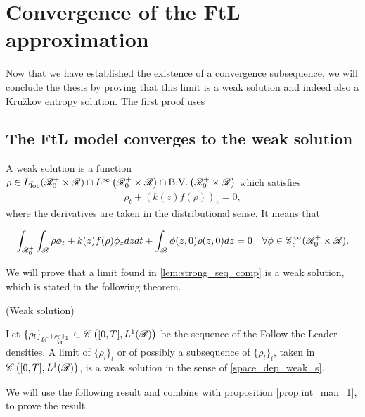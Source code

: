 
\chapter{Convergence of the FtL approximation}

Now that we have established the existence of a convergence subsequence, we will conclude the thesis by proving that this limit is a weak solution and indeed also a Kružkov entropy solution. The first proof uses 

\section{The FtL model converges to the weak solution} \label{section:weak_sol}


A weak solution is a function $\rho \in L^1_{\text{loc}}(\mathscr{R}^+_0 \times \mathscr{R}) \cap L^\infty\left(\mathscr{R}^+_0 \times \mathscr{R}\right)\cap \text{B.V.}\left(\mathscr{R}^+_0 \times \mathscr{R}\right)$ which satisfies 
\begin{align}
	\rho_t + (k(z)f(\rho))_z = 0, 
\end{align}
where the derivatives are taken in the distributional sense. It means that 

\begin{equation} \label{space_dep_weak_s}
	\int_{\mathscr{R}_0^+}\int_{\mathscr{R}} \rho \phi_t + k(z) f(\rho) \phi_z dz dt + \int_{\mathscr{R}} \phi(z,0) \rho(z,0) dz= 0 \quad \forall \phi \in \mathscr{C}^\infty_c(\mathscr{R}^+_0 \times \mathscr{R}).
\end{equation}

We will prove that a limit found in \eqref{lem:strong_seq_comp} is a weak solution, which is stated in the following theorem.  

\begin{mythm} (Weak solution) \label{thm:weak_solution}
	
	Let $\{\rho_l\}_{l \in \frac{\norm{\rho_0}_1}{\N}} \subset \mathscr{C}\left([0,T], L^1(\R)\right)$ be the sequence of the Follow the Leader densities. A limit of $\{\rho_l\}_l$ or of possibly a subsequence of $\{\rho_l\}_l$, taken in $\mathscr{C}\left([0,T], L^1(\mathscr{R})\right)$, is a weak solution in the sense of \eqref{space_dep_weak_s}. 
\end{mythm}

We will use the following result and combine with proposition \eqref{prop:int_man_1}, to prove the result. 

